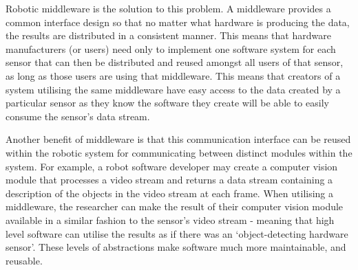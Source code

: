 \documentclass[../dissertation.tex]{subfiles}
\begin{document}
Robotic middleware is the solution to this problem. A middleware provides a common interface design so that no matter what hardware is producing the data, the results are distributed in a consistent manner. This means that hardware manufacturers (or users) need only to implement one software system for each sensor that can then be distributed and reused amongst all users of that sensor, as long as those users are using that middleware. This means that creators of a  system utilising the same middleware have easy access to the data created by a particular sensor as they know the software they create will be able to easily consume the sensor's data stream.

Another benefit of middleware is that this communication interface can be reused within the robotic system for communicating between distinct modules within the system. For example, a robot software developer may create a computer vision module that processes a video stream and returns a data stream containing a description of the objects in the video stream at each frame. When utilising a middleware, the researcher can make the result of their computer vision module available in a similar fashion to the sensor's video stream - meaning that high level software can utilise the results as if there was an `object-detecting hardware sensor'. These levels of abstractions make software much more maintainable, and reusable.
\end{document}
